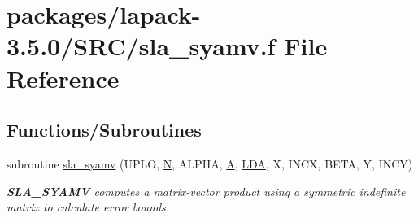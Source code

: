 \hypertarget{sla__syamv_8f}{}\section{packages/lapack-\/3.5.0/\+S\+R\+C/sla\+\_\+syamv.f File Reference}
\label{sla__syamv_8f}
\subsection*{Functions/\+Subroutines}
\begin{DoxyCompactItemize}
\item 
subroutine \hyperlink{group__realSYcomputational_ga1eb39049af684991f53c9be704fbc56d}{sla\+\_\+syamv} (U\+P\+L\+O, \hyperlink{polmisc_8c_a0240ac851181b84ac374872dc5434ee4}{N}, A\+L\+P\+H\+A, \hyperlink{classA}{A}, \hyperlink{example__user_8c_ae946da542ce0db94dced19b2ecefd1aa}{L\+D\+A}, X, I\+N\+C\+X, B\+E\+T\+A, Y, I\+N\+C\+Y)
\begin{DoxyCompactList}\small\item\em {\bfseries S\+L\+A\+\_\+\+S\+Y\+A\+M\+V} computes a matrix-\/vector product using a symmetric indefinite matrix to calculate error bounds. \end{DoxyCompactList}\end{DoxyCompactItemize}
